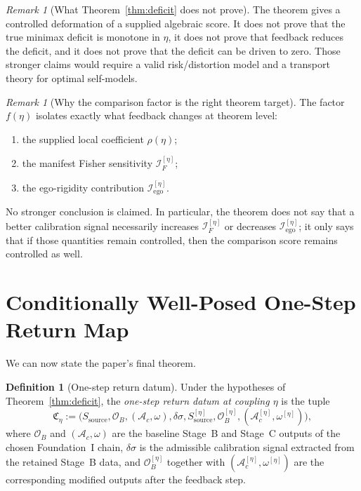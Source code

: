 \documentclass[12pt]{article}
\theoremstyle{definition}
\newtheorem{definition}[theorem]{Definition}
\theoremstyle{remark}
\newtheorem{remark}[theorem]{Remark}
\begin{document}
\begin{remark}[What Theorem~\ref{thm:deficit} does not prove]
The theorem gives a controlled deformation of a supplied algebraic
score. It does not prove that the true minimax deficit is monotone in
\(\eta\), it does not prove that feedback reduces the deficit, and it
does not prove that the deficit can be driven to zero. Those stronger
claims would require a valid risk/distortion model and a transport theory
for optimal self-models.
\end{remark}

\begin{remark}[Why the comparison factor is the right theorem target]
The factor \(f(\eta)\) isolates exactly what feedback changes at theorem
level:
\begin{enumerate}
\item the supplied local coefficient \(\rho(\eta)\);
\item the manifest Fisher sensitivity
  \(\mathcal I_F^{[\eta]}\);
\item the ego-rigidity contribution
  \(\mathcal I_{\mathrm{ego}}^{[\eta]}\).
\end{enumerate}
No stronger conclusion is claimed. In particular, the theorem does not
say that a better calibration signal necessarily increases
\(\mathcal I_F^{[\eta]}\) or decreases
\(\mathcal I_{\mathrm{ego}}^{[\eta]}\); it only says that if those
quantities remain controlled, then the comparison score remains
controlled as well.
\end{remark}

\section{Conditionally Well-Posed One-Step Return Map}\label{sec:closed}

We can now state the paper's final theorem.

\begin{definition}[One-step return datum]\label{def:closed}
Under the hypotheses of Theorem~\ref{thm:deficit}, the
\emph{one-step return datum at coupling \(\eta\)} is the tuple
\[
\mathfrak C_\eta
:=
\bigl(
S_{\mathrm{source}},
\mathcal O_B,
(\mathcal A_c,\omega),
\delta\sigma,
S_{\mathrm{source}}^{[\eta]},
\mathcal O_B^{[\eta]},
(\mathcal A_c^{[\eta]},\omega^{[\eta]})
\bigr),
\]
where \(\mathcal O_B\) and \((\mathcal A_c,\omega)\) are the baseline
Stage~B and Stage~C outputs of the chosen Foundation~I chain,
\(\delta\sigma\) is the admissible calibration signal extracted from the
retained Stage~B data, and
\(\mathcal O_B^{[\eta]}\) together with
\((\mathcal A_c^{[\eta]},\omega^{[\eta]})\) are the corresponding
modified outputs after the feedback step.
\end{definition}
\end{document}

